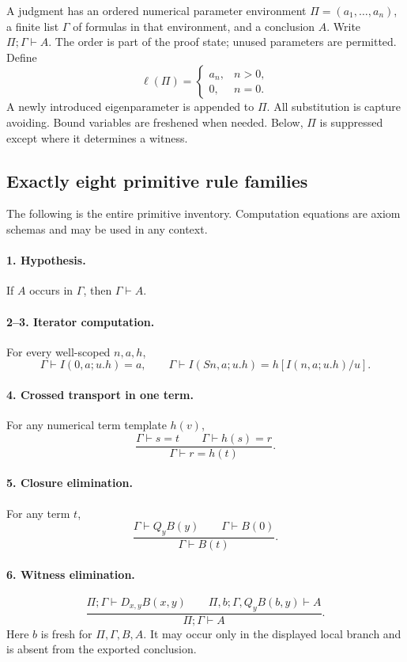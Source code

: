 \documentclass[11pt]{article}
\theoremstyle{definition}
\theoremstyle{remark}
\begin{document}
A judgment has an ordered numerical parameter environment
$\Pi=(a_1,\ldots,a_n)$, a finite list $\Gamma$ of formulas in that
environment, and a conclusion $A$. Write $\Pi;\Gamma\vdash A$.
The order is part of the proof state; unused parameters are permitted.
Define
\[
 \ell(\Pi)=\begin{cases}a_n,&n>0,\\0,&n=0.\end{cases}
\]
A newly introduced eigenparameter is appended to $\Pi$. All substitution
is capture avoiding. Bound variables are freshened when needed. Below,
$\Pi$ is suppressed except where it determines a witness.

\subsection{Exactly eight primitive rule families}

The following is the entire primitive inventory. Computation equations
are axiom schemas and may be used in any context.

\paragraph{1. Hypothesis.}
If $A$ occurs in $\Gamma$, then $\Gamma\vdash A$.

\paragraph{2--3. Iterator computation.}
For every well-scoped $n,a,h$,
\[
 \Gamma\vdash I(0,a;u.h)=a,
 \qquad
 \Gamma\vdash I(Sn,a;u.h)=h[I(n,a;u.h)/u].
 \tag{I0, IS}
\]

\paragraph{4. Crossed transport in one term.}
For any numerical term template $h(v)$,
\[
 \frac{\Gamma\vdash s=t\qquad\Gamma\vdash h(s)=r}
      {\Gamma\vdash r=h(t)}.
 \tag{Tr1}
\]

\paragraph{5. Closure elimination.}
For any term $t$,
\[
 \frac{\Gamma\vdash Q_yB(y)\qquad\Gamma\vdash B(0)}
      {\Gamma\vdash B(t)}.
 \tag{QE}
\]

\paragraph{6. Witness elimination.}
\[
 \frac{\Pi;\Gamma\vdash D_{x,y}B(x,y)\qquad
       \Pi,b;\Gamma,Q_yB(b,y)\vdash A}
      {\Pi;\Gamma\vdash A}.
 \tag{DE}
\]
Here $b$ is fresh for $\Pi,\Gamma,B,A$. It may occur only in the
displayed local branch and is absent from the exported conclusion.
\end{document}
